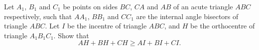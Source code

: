 Let $A_1$, $B_1$ and $C_1$ be points on sides $BC$, $CA$ and $AB$ of an acute triangle $ABC$ respectively, such that $AA_1$, $BB_1$ and $CC_1$ are the internal angle bisectors of triangle $ABC$. Let $I$ be the incentre of triangle $ABC$, and $H$ be the orthocentre of triangle $A_1 B_1 C_1$. Show that
\[ AH + BH + CH \geq AI + BI + CI. \]
